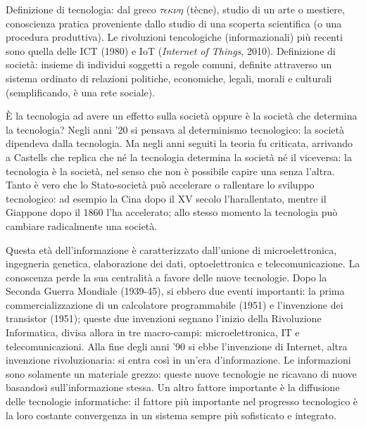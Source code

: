 \documentclass[a4page, 11pt]{article}
\begin{document}
Definizione di tecnologia: dal greco $\tau\epsilon\kappa\nu\eta$ (tècne), studio di un arte o mestiere, conoscienza pratica proveniente dallo studio di una scoperta scientifica (o una procedura produttiva).
Le rivoluzioni tencologiche (informazionali) più recenti sono quella delle ICT (1980) e IoT (\textit{Internet of Things}, 2010). \newline
Definizione di società: insieme di individui soggetti a regole comuni, definite attraverso un sistema ordinato di relazioni politiche, economiche, legali, morali e culturali (semplificando, è una rete sociale).

È la tecnologia ad avere un effetto sulla società oppure è la società che determina la tecnologia?
Negli anni '20 si pensava al determinismo tecnologico: la società dipendeva dalla tecnologia.
Ma negli anni seguiti la teoria fu criticata, arrivando a Castells che replica che né la tecnologia determina la società né il viceversa: la tecnologia è la società, nel senso che non è possibile capire una senza l'altra.
Tanto è vero che lo Stato-società può accelerare o rallentare lo sviluppo tecnologico: ad esempio la Cina dopo il XV secolo l'harallentato, mentre il Giappone dopo il 1860 l'ha accelerato; allo stesso momento la tecnologia può cambiare radicalmente una società.

Questa età dell'informazione è caratterizzato dall'unione di microelettronica, ingegneria genetica, elaborazione dei dati, optoelettronica e telecomunicazione.
La conoscenza perde la sua centralità a favore delle nuove tecnologie.
Dopo la Seconda Guerra Mondiale (1939-45), si ebbero due eventi importanti: la prima commercializzazione di un calcolatore programmabile (1951) e l'invenzione dei transistor (1951); queste due invenzioni segnano l'inizio della Rivoluzione Informatica, divisa allora in tre macro-campi: microelettronica, IT e telecomunicazioni.
Alla fine degli anni '90 si ebbe l'invenzione di Internet, altra invenzione rivoluzionaria: si entra così in un'era d'informazione.
Le informazioni sono solamente un materiale grezzo: queste nuove tecnologie ne ricavano di nuove basandosi sull'informazione stessa.
Un altro fattore importante è la diffusione delle tecnologie informatiche: il fattore più importante nel progresso tecnologico è la loro costante convergenza in un sistema sempre più sofisticato e integrato.
\end{document}
